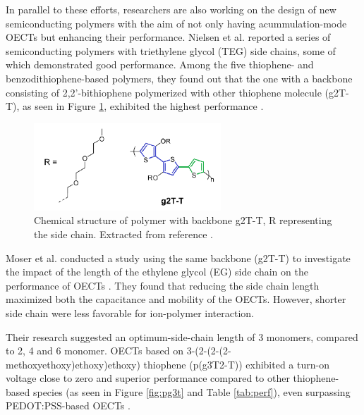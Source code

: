 In parallel to these efforts, researchers are also working on the design of new semiconducting polymers with the aim of not only having acummulation-mode OECTs but enhancing their performance. Nielsen et al. reported a series of semiconducting polymers with triethylene glycol (TEG) side chains, some of which demonstrated good performance. Among the five thiophene- and benzodithiophene-based polymers, they found out that the one with a %
backbone consisting of 2,2'-bithiophene polymerized with other thiophene molecule (g2T-T), as seen in Figure \ref{fig:g2TT}, exhibited the highest performance %
\cite{nielsenMolecularDesignSemiconducting2016}.

\begin{figure}[h]
	\centering
	\includegraphics[width=7cm]{Images/pdf/g2T-T.pdf}
	\caption[Chemical structure of polymer g2T-T]{Chemical structure of polymer with backbone g2T-T, R representing the side chain. Extracted from reference \cite{nielsenMolecularDesignSemiconducting2016}.}
	\label{fig:g2TT}
\end{figure}

Moser et al. conducted a study using the same backbone (g2T-T) to investigate the impact of the length of the ethylene glycol (EG) side chain on the performance of OECTs 
\cite{moserEthyleneGlycolBasedSide2020}. They found that reducing the side chain length maximized both the capacitance and mobility of the OECTs. However, shorter side chain were less favorable for ion-polymer interaction. 

Their research suggested an optimum-side-chain length of 3 monomers, compared to 2, 4 and 6 monomer. OECTs based on 3-(2-(2-(2-methoxyethoxy)ethoxy)ethoxy) thiophene (p(g3T2-T)) exhibited a turn-on voltage close to zero and superior performance compared to other thiophene-based species (as seen in Figure \ref{fig:pg3t} and Table \ref{tab:perf}), even surpassing PEDOT:PSS-based OECTs \cite{inalBenchmarkingOrganicMixed2017}. %


